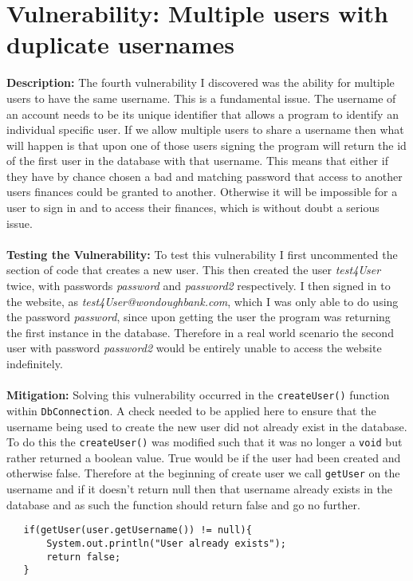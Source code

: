 \section{Vulnerability: Multiple users with duplicate usernames}
\label{sec:background}
\textbf{Description:} The fourth vulnerability I discovered was the ability for multiple users to have the same username. This is a fundamental issue. The username of an account
needs to be its unique identifier that allows a program to identify an individual specific user. If we allow multiple users to share a username then what will happen is that
upon one of those users signing the program will return the id of the first user in the database with that username. This means that either if they have by chance chosen a
bad and matching password that access to another users finances could be granted to another. Otherwise it will be impossible for a user to sign in and to access their finances,
which is without doubt a serious issue.\\ \\
\textbf{Testing the Vulnerability:} To test this vulnerability I first uncommented the section of code that creates a new user. This then created the user \textit{test4User}
twice, with passwords \textit{password} and \textit{password2} respectively. I then signed in to the website, as \textit{test4User@wondoughbank.com}, which I was only able to
do using the password \textit{password}, since upon getting the user the program was returning the first instance in the database. Therefore in a real world scenario the second
user with password \textit{password2} would be entirely unable to access the website indefinitely.\\ \\
\textbf{Mitigation:} Solving this vulnerability occurred in the \verb|createUser()| function within \verb|DbConnection|. A check needed to be applied here to ensure that the
username being used to create the new user did not already exist in the database. To do this the \verb|createUser()| was modified such that it was no longer a \verb|void| but rather
returned a boolean value. True would be if the user had been created and otherwise false. Therefore at the beginning of create user we call \verb|getUser| on the username and
if it doesn't return null then that username already exists in the database and as such the function should return false and go no further.
\begin{verbatim}
   if(getUser(user.getUsername()) != null){
       System.out.println("User already exists");
       return false;
   }
\end{verbatim}

